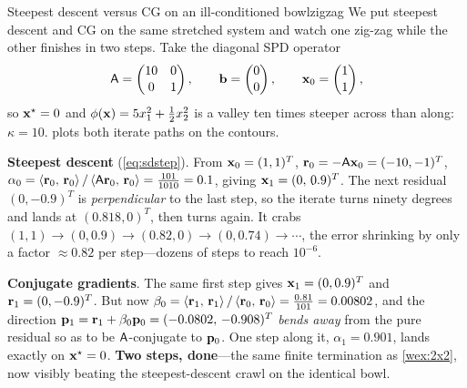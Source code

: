 \begin{workedexample}{Steepest descent versus CG on an ill-conditioned bowl}{zigzag}
We put steepest descent and CG on the same stretched system and watch one
zig-zag while the other finishes in two steps. Take the diagonal SPD operator
\[
  \mathsf{A}=\begin{pmatrix}10 & 0\\[1pt] 0 & 1\end{pmatrix},\qquad
  \mathbf{b}=\begin{pmatrix}0\\[1pt] 0\end{pmatrix},\qquad
  \mathbf{x}_0=\begin{pmatrix}1\\[1pt] 1\end{pmatrix},
\]
so $\mathbf{x}^\star=0$ and $\phi(\mathbf{x})=5x_1^2+\tfrac12x_2^2$ is a valley ten times
steeper across than along: $\kappa=10$.  plots both iterate
paths on the contours.

\tcblower
\textbf{Steepest descent} (\cref{eq:sdstep}). From $\mathbf{x}_0=(1,1)^{T}$,
$\mathbf{r}_0=-\mathsf{A}\mathbf{x}_0=(-10,-1)^{T}$,
$\alpha_0=\left\langle \mathbf{r}_0,\, \mathbf{r}_0\right\rangle/\left\langle \mathsf{A}\mathbf{r}_0,\, \mathbf{r}_0\right\rangle
=\tfrac{101}{1010}=0.1$, giving $\mathbf{x}_1=(0,\,0.9)^{T}$. The next residual
$(0,-0.9)^{T}$ is \emph{perpendicular} to the last step, so the iterate turns
ninety degrees and lands at $(0.818,0)^{T}$, then turns again. It crabs
$(1,1)\to(0,0.9)\to(0.82,0)\to(0,0.74)\to\cdots$, the error shrinking by only a
factor $\approx0.82$ per step---dozens of steps to reach $10^{-6}$.

\textbf{Conjugate gradients}. The same first step gives $\mathbf{x}_1=(0,0.9)^{T}$ and
$\mathbf{r}_1=(0,-0.9)^{T}$. But now $\beta_0=\left\langle \mathbf{r}_1,\, \mathbf{r}_1\right\rangle/\left\langle \mathbf{r}_0,\, \mathbf{r}_0\right\rangle
=\tfrac{0.81}{101}=0.00802$, and the direction
$\mathbf{p}_1=\mathbf{r}_1+\beta_0\mathbf{p}_0=(-0.0802,\,-0.908)^{T}$ \emph{bends away} from the pure
residual so as to be $\mathsf{A}$-conjugate to $\mathbf{p}_0$. One step along it,
$\alpha_1=0.901$, lands exactly on $\mathbf{x}^\star=0$. \textbf{Two steps, done}---the
same finite termination as \cref{wex:2x2}, now visibly beating the
steepest-descent crawl on the identical bowl.
\end{workedexample}

